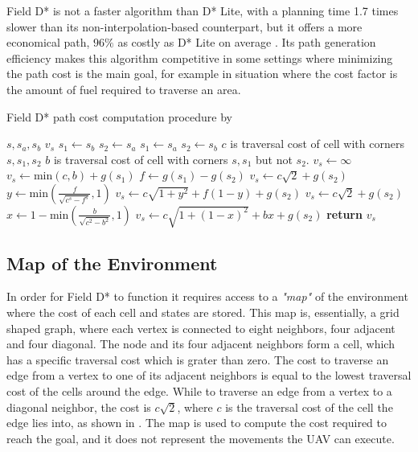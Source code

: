 Field D* is not a faster algorithm than D* Lite, with a planning time 1.7 times slower than its non-interpolation-based counterpart, 
but it offers a more economical path, $96\%$ as costly as D* Lite on average \autocite{DF06}. Its path generation efficiency makes
this algorithm competitive in some settings where minimizing the path cost is the main goal, for example in situation where the 
cost factor is the amount of fuel required to traverse an area.

\begin{algorithm}
	\algrenewcommand{}
	\algrenewcommand{}
	\caption{Field D* path cost computation procedure by \autocite{DF06}}\label{alg:fds-cc}
	\begin{algorithmic}[1]
		\Require $s, s_a, s_b$
		\Ensure $v_s$ 
		\State $s_1 \gets s_b$ 
		\State $s_2 \gets s_a$
		\Else
		\State $s_1 \gets s_a$ 
		\State $s_2 \gets s_b$ 
		\EndIf
		\State $c$ is traversal cost of cell with corners $s, s_1, s_2$ 
		\State $b$ is traversal cost of cell with corners $s, s_1$ but not $s_2$.
		\State $v_s \gets \infty$
		\State $v_s \gets \mathrm{min}(c,b) + g(s_1)$
		\Else
		\State $f \gets g(s_1) - g(s_2)$ 
		\State $v_s \gets c \sqrt{2} + g(s_2)$
		\Else
		\State $y \gets \mathrm{min}\left(\frac{f}{\sqrt{c^s - f^s}}, 1\right)$
		\State $v_s \gets c \sqrt{1 + y^2} + f(1 - y) + g(s_2)$
		\EndIf
		\Else
		\State $v_s \gets c \sqrt{2} + g(s_2)$
		\Else 
		\State $x \gets 1 - \mathrm{min}\left(\frac{b}{\sqrt{c^2 - b^2}},1\right)$
		\State $v_s \gets c \sqrt{1 + (1-x)^2} + bx + g(s_2)$
		\EndIf
		\EndIf
		\EndIf
		\State \textbf{return} $v_s$
	\end{algorithmic}
\end{algorithm}

\newpage

\subsection{Map of the Environment}

In order for Field D* to function it requires access to a \emph{"map"} of the environment
where the cost of each cell and states are stored. This map is, essentially, a grid shaped
graph, where each vertex is connected to eight neighbors, four adjacent and four diagonal. 
The node and its four adjacent neighbors form a cell, which has a specific traversal cost which
is grater than zero. The cost to traverse an edge from a vertex to one of its adjacent neighbors
is equal to the lowest traversal cost of the cells around the edge. While to traverse an edge
from a vertex to a diagonal neighbor, the cost is $c \sqrt{2}$, where $c$ is the traversal cost
of the cell the edge lies into, as shown in \autocite{DF06}. The map is used to compute the 
cost required to reach the goal, and it does not represent the movements the UAV can execute. 

